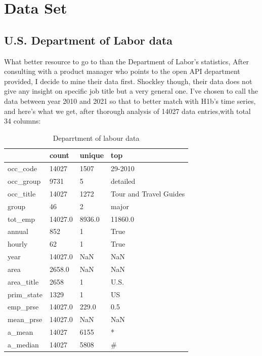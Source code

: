 \section{Data Set}
\subsection{U.S. Department of Labor data}
What better resource to go to than the Department of Labor's statistics, After consulting with a product manager who points to the open API  department provided, I decide to mine their data first.  Shockley though, their data does not give any insight on specific job title but a very general one. I've chosen to call the data between year 2010 and 2021 so that to better match with H1b's time series, and here's what we get, after thorough analysis  of 14027 data entries,with total 34 columns:\\
\begin{table}[h!]
	\caption{Deparrtment of  labour data }
	\resizebox{\columnwidth}{!}
	{%
		
		\begin{tabular}{llll}
			\hline
			{} &    count &  unique &                     top \\
			\hline
			occ\_code   &    14027 &    1507 &                 29-2010 \\
			occ\_group  &     9731 &       5 &                detailed \\
			occ\_title  &    14027 &    1272 &  Tour and Travel Guides \\
			group      &       46 &       2 &                   major \\
			tot\_emp    &  14027.0 &  8936.0 &                 11860.0 \\
			annual     &      852 &       1 &                    True \\
			hourly     &       62 &       1 &                    True \\
			year       &  14027.0 &     NaN &                     NaN \\
			area       &   2658.0 &     NaN &                     NaN \\
			area\_title &     2658 &       1 &                    U.S. \\
			prim\_state &     1329 &       1 &                      US \\
			emp\_prse   &  14027.0 &   229.0 &                     0.5 \\
			mean\_prse  &  14027.0 &     NaN &                     NaN \\
			a\_mean     &    14027 &    6155 &                       * \\
			a\_median   &    14027 &    5808 &                       \# \\
			\hline
		\end{tabular}
		
	}
\end{table}


